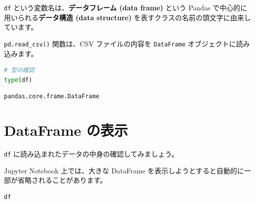 \texttt{df} という変数名は、\textbf{データフレーム (data frame)} という Pandas で中心的に用いられる\textbf{データ構造 (data structure)} を表すクラスの名前の頭文字に由来しています。

\texttt{pd.read\_csv()} 関数は、CSV ファイルの内容を \texttt{DataFrame} オブジェクトに読み込みます。


\begin{lstlisting}[style=codecell,language=Python]
# 型の確認
type(df)
\end{lstlisting}

\begin{lstlisting}[style=outputcell]
pandas.core.frame.DataFrame
\end{lstlisting}

\section{DataFrame の表示}


\texttt{df} に読み込まれたデータの中身の確認してみましょう。

Jupyter Notebook 上では、大きな DataFrame を表示しようとすると自動的に一部が省略されることがあります。


\begin{lstlisting}[style=codecell,language=Python]
df
\end{lstlisting}

